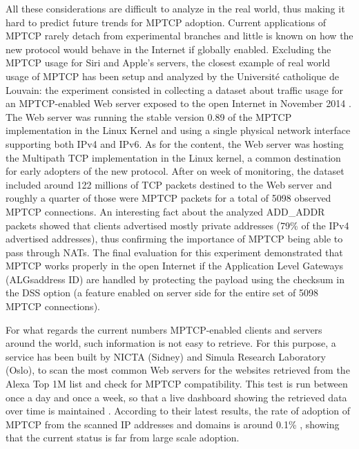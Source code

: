 All these considerations are difficult to analyze in the real world, thus making it hard to predict future trends for MPTCP adoption. Current applications of MPTCP rarely detach from experimental branches and little is known on how the new protocol would behave in the Internet if globally enabled. Excluding the MPTCP usage for Siri and Apple's servers, the closest example of real world usage of MPTCP has been setup and analyzed by the Université catholique de Louvain: the experiment consisted in collecting a dataset about traffic usage for an MPTCP-enabled Web server exposed to the open Internet in November 2014 \cite{HTSB15}. The Web server was running the stable version 0.89 of the MPTCP implementation in the Linux Kernel and using a single physical network interface supporting both IPv4 and IPv6. As for the content, the Web server was hosting the Multipath TCP implementation in the Linux kernel, a common destination for early adopters of the new protocol. After on week of monitoring, the dataset included around 122 millions of TCP packets destined to the Web server and roughly a quarter of those were MPTCP packets for a total of 5098 observed MPTCP connections. 
An interesting fact about the analyzed ADD\_ADDR packets showed that clients advertised mostly private addresses (79\% of the IPv4 advertised addresses), thus confirming the importance of MPTCP being able to pass through NATs. 
The final evaluation for this experiment demonstrated that MPTCP works properly in the open Internet if the Application Level Gateways (ALGsaddress ID) are handled by protecting the payload using the checksum in the DSS option (a feature enabled on server side for the entire set of 5098 MPTCP connections).

For what regards the current numbers MPTCP-enabled clients and servers around the world, such information is not easy to retrieve. For this purpose, a service has been built by NICTA (Sidney) and Simula Research Laboratory (Oslo), to scan the most common Web servers for the websites retrieved from the Alexa Top 1M list and check for MPTCP compatibility. This test is run between once a day and once a week, so that a live dashboard showing the retrieved data over time is maintained \cite{dashboard}. According to their latest results, the rate of adoption of MPTCP from the scanned IP addresses and domains is around 0.1\% \cite{Mehani:2015:ELM:2798087.2798088}, showing that the current status is far from large scale adoption.